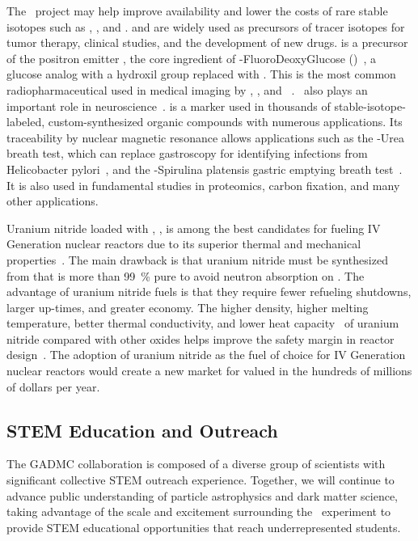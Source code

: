 The \Aria\ project may help improve availability and lower the costs of rare stable isotopes such as , , and .   and  are widely used as precursors of tracer isotopes for tumor therapy, clinical studies, and the development of new drugs.   is a precursor of the positron emitter , the core ingredient of -FluoroDeoxyGlucose (\FDG)~\cite{Pacak:1969cf}, a glucose analog with a hydroxil group replaced with .  This is the most common radiopharmaceutical used in medical imaging by \PET, \TOFPET, and \PETCT~\cite{Som:1980vv,Kelloff:2005hm}.  \FDG\ also plays an important role in neuroscience~\cite{Newberg:2002hq}.   is a marker used in thousands of stable-isotope-labeled, custom-synthesized organic compounds with numerous applications.  Its traceability by nuclear magnetic resonance allows applications such as the -Urea breath test, which can replace gastroscopy for identifying infections from Helicobacter pylori~\cite{Graham:1987cy}, and the -Spirulina platensis gastric emptying breath test~\cite{Bharucha:2012eu}.  It is also used in fundamental studies in proteomics, carbon fixation, and many other applications.

Uranium nitride loaded with , , is among the best candidates for  fueling IV Generation nuclear reactors due to its superior thermal and mechanical properties~\cite{Zakova:2012dy,Youinou:2014dv,Jaques:2015cw}.  The main drawback is that uranium nitride must be synthesized from  that is more than \SI{99}{\percent} pure to avoid neutron absorption on . The  advantage of  uranium nitride fuels is that they require fewer refueling shutdowns, larger up-times, and greater economy.  The  higher density, higher melting temperature, better thermal conductivity, and lower heat capacity~\cite{Hayes:1990hz,Hayes:1990go} of uranium nitride compared with other oxides helps improve the safety margin in reactor design~\cite{Zhao:2014ia}.  The adoption of uranium nitride as the fuel of choice for IV Generation nuclear reactors would create a new market for  valued in the hundreds of millions of dollars per year.


\subsection{STEM Education and Outreach}

The GADMC collaboration is composed of a diverse group of scientists with significant collective STEM outreach experience. Together, we will continue to advance public understanding of particle astrophysics and dark matter science, taking advantage of the scale and excitement surrounding the \DSks\ experiment to provide STEM educational opportunities that reach underrepresented students.

